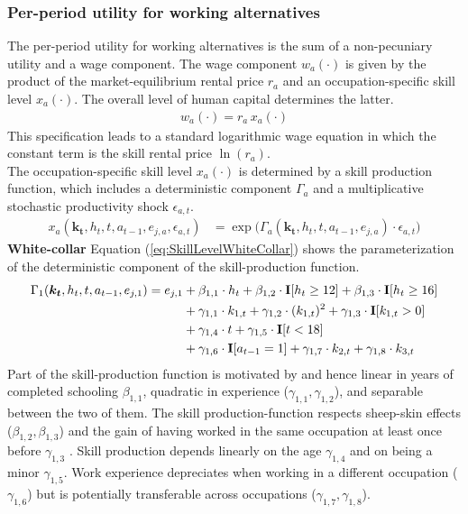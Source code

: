 \subsubsection*{Per-period utility for working alternatives}
The per-period utility for working alternatives is the sum of a non-pecuniary utility and a wage component. The wage component $w_{a}(\cdot)$ is given by the product of the market-equilibrium rental price $r_{a}$ and an occupation-specific skill level $x_{a}(\cdot)$. The overall level of human capital determines the latter.
%
\begin{align*}
w_{a}(\cdot) = r_{a} \, x_{a}(\cdot)
\end{align*}
%
This specification leads to a standard logarithmic wage equation in which the constant term is the skill rental price $\ln(r_{a})$.\\

\noindent The occupation-specific skill level $x_{a}(\cdot)$ is determined by a skill production function, which includes a deterministic component $\Gamma_a$ and a multiplicative stochastic productivity shock $\epsilon_{a,t}$.
%
\begin{align}%
    x_{a}(\bm{k_t}, h_t, t, a_{t-1}, e_{j, a}, \epsilon_{a,t}) & = \exp \big( \Gamma_{a}(\bm{k_t},  h_t, t, a_{t-1}, e_{j,a}) \cdot \epsilon_{a,t} \big) \nonumber
\end{align}
%
\noindent\textbf{White-collar} Equation (\ref{eq:SkillLevelWhiteCollar}) shows the parameterization of the deterministic component of the skill-production function.
%
\begin{align}\label{eq:SkillLevelWhiteCollar}
    \Gamma_1(\bm{k_t}, h_t, t, a_{t-1}, e_{j, 1}) = e_{j,1} & + \beta_{1,1} \cdot h_t + \beta_{1, 2} \cdot {\textbf{I}}[h_t \geq 12] + \beta_{1,3} \cdot {\textbf{I}}[h_t\geq 16]\\ \nonumber
                                  & + \gamma_{1, 1} \cdot  k_{1,t} + \gamma_{1,2} \cdot  (k_{1,t})^2 + \gamma_{1,3} \cdot  {\textbf{I}}[k_{1,t} > 0] \\ \nonumber
                                & + \gamma_{1,4} \cdot  t + \gamma_{1,5} \cdot {\textbf{I}}[t < 18]\\ \nonumber
                                  & + \gamma_{1,6} \cdot {\textbf{I}}[a_{t-1} = 1] + \gamma_{1,7} \cdot  k_{2,t} + \gamma_{1,8} \cdot  k_{3,t} \nonumber
\end{align}
%
\noindent Part of the skill-production function is motivated by \citet{Mincer.1958, Mincer.1974} and hence linear in years of completed schooling $\beta_{1,1}$, quadratic in experience ($\gamma_{1,1}, \gamma_{1,2}$), and separable between the two of them. The skill production-function respects sheep-skin effects ($\beta_{1,2}, \beta_{1,3}$) and the gain of having worked in the same occupation at least once before $\gamma_{1,3}$ \citep{Spence.1973, Jaeger.1996}. Skill production depends linearly on the age $\gamma_{1,4}$ and on being a minor $\gamma_{1,5}$. Work experience depreciates when working in a different occupation ($\gamma_{1,6}$) but is potentially transferable across occupations ($\gamma_{1,7}, \gamma_{1,8}$). \\


